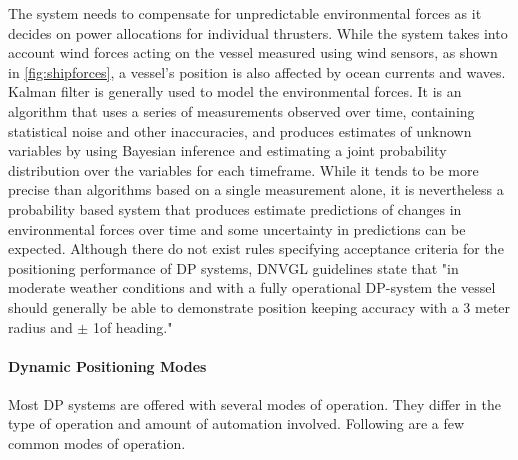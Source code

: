 The system needs to compensate for unpredictable environmental forces as it decides on power allocations for individual thrusters. While the system takes into account wind forces acting on the vessel measured using wind sensors, as shown in \ref{fig:shipforces}, a vessel's position is also affected by ocean currents and waves. Kalman filter is generally used to model the environmental forces. It is an algorithm that uses a series of measurements observed over time, containing statistical noise and other inaccuracies, and produces estimates of unknown variables by using Bayesian inference and estimating a joint probability distribution over the variables for each timeframe. While it tends to be more precise than algorithms based on a single measurement alone, it is nevertheless a probability based system that produces estimate predictions of changes in environmental forces over time and some uncertainty in predictions can be expected. Although there do not exist rules specifying acceptance criteria for the positioning performance of DP systems, DNVGL guidelines state that "in moderate weather conditions and with a fully operational DP-system the vessel should generally be able to demonstrate position keeping accuracy with a 3 meter radius and $ \pm $ 1\degree of heading." \parencite{veritas2011dynamic} 





\paragraph{Dynamic Positioning Modes}
Most DP systems are offered with several modes of operation. They differ in the type of operation and amount of automation involved. Following are a few common modes of operation. 


